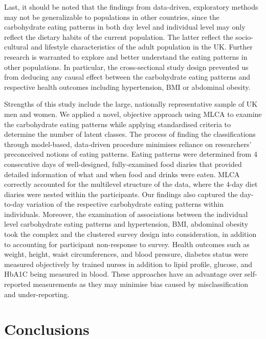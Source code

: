 Last, it should be noted that the findings from data-driven, exploratory methods may not be
generalizable to populations in other countries, since the carbohydrate eating patterns in both day level and individual level may only reflect the dietary habits of the current population. The latter reflect the socio-cultural and lifestyle characteristics of the adult population in the UK. Further research is warranted to explore and better understand the eating patterns in other populations. In particular, the cross-sectional study design prevented us from deducing any causal effect between the carbohydrate eating patterns and respective health outcomes including hypertension, BMI or abdominal obesity. 

Strengths of this study include the large, nationally representative sample of UK men and women. We applied a novel, objective approach using MLCA to examine the carbohydrate eating patterns while applying standardised criteria to determine the number of latent classes. The process of finding the classifications through model-based, data-driven procedure minimises reliance on researchers' preconceived notions of eating patterns. Eating patterns were determined from 4 consecutive days of well-designed, fully-examined food diaries that provided detailed information of what and when food and drinks were eaten. MLCA correctly accounted for the multilevel structure of the data, where the 4-day diet diaries were nested within the participants. Our findings also captured the day-to-day variation of the respective carbohydrate eating patterns within individuals. Moreover, the examination of associations between the individual level carbohydrate eating patterns and hypertension, BMI, abdominal obesity took the complex and the clustered survey design into consideration, in addition to accounting for participant non-response to survey. Health outcomes such as weight, height, waist circumferences, and blood pressure, diabetes status were measured objectively by trained nurses in addition to lipid profile, glucose, and HbA1C being measured in blood. These approaches have an advantage over self-reported measurements as they may minimise bias caused by misclassification and under-reporting.

\section{Conclusions}

